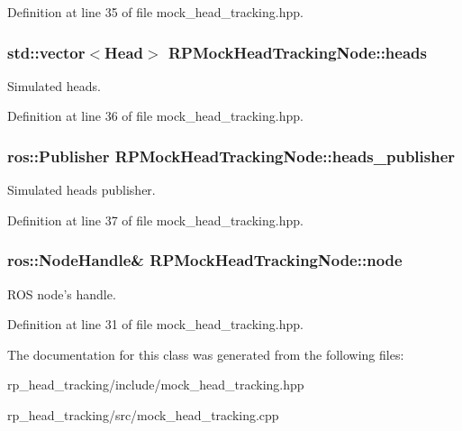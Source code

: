 \-Definition at line 35 of file mock\-\_\-head\-\_\-tracking.\-hpp.

\hypertarget{class_r_p_mock_head_tracking_node_a9eb51fd17b3436f4d4058be0e1a204d8}{
\subsubsection[{heads}]{\setlength{\rightskip}{0pt plus 5cm}std\-::vector$<${\bf \-Head}$>$ {\bf \-R\-P\-Mock\-Head\-Tracking\-Node\-::heads}}}\label{class_r_p_mock_head_tracking_node_a9eb51fd17b3436f4d4058be0e1a204d8}
\-Simulated heads. 

\-Definition at line 36 of file mock\-\_\-head\-\_\-tracking.\-hpp.

\hypertarget{class_r_p_mock_head_tracking_node_a4d78d8388d295ef1120818d2e8f2954e}{
\subsubsection[{heads\-\_\-publisher}]{\setlength{\rightskip}{0pt plus 5cm}ros\-::\-Publisher {\bf \-R\-P\-Mock\-Head\-Tracking\-Node\-::heads\-\_\-publisher}}}\label{class_r_p_mock_head_tracking_node_a4d78d8388d295ef1120818d2e8f2954e}
\-Simulated heads publisher. 

\-Definition at line 37 of file mock\-\_\-head\-\_\-tracking.\-hpp.

\hypertarget{class_r_p_mock_head_tracking_node_a2294de9d2f407990783725f89aca9f43}{
\subsubsection[{node}]{\setlength{\rightskip}{0pt plus 5cm}ros\-::\-Node\-Handle\& {\bf \-R\-P\-Mock\-Head\-Tracking\-Node\-::node}}}\label{class_r_p_mock_head_tracking_node_a2294de9d2f407990783725f89aca9f43}
\-R\-O\-S node's handle. 

\-Definition at line 31 of file mock\-\_\-head\-\_\-tracking.\-hpp.



\-The documentation for this class was generated from the following files\-:\begin{DoxyCompactItemize}
\item 
rp\-\_\-head\-\_\-tracking/include/mock\-\_\-head\-\_\-tracking.\-hpp\item 
rp\-\_\-head\-\_\-tracking/src/mock\-\_\-head\-\_\-tracking.\-cpp\end{DoxyCompactItemize}
